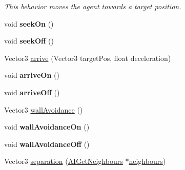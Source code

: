 \begin{DoxyCompactItemize}
\begin{DoxyCompactList}\small\item\em \-This behavior moves the agent towards a target position. \end{DoxyCompactList}\item 
\hypertarget{classAIMovementController_a011043dd19b70d4e670a4b7ab1831b69}{
void {\bfseries seek\-On} ()}
\label{d2/d30/classAIMovementController_a011043dd19b70d4e670a4b7ab1831b69}

\item 
\hypertarget{classAIMovementController_a5499e71d0aeba1f17d7c24cf03bbff23}{
void {\bfseries seek\-Off} ()}
\label{d2/d30/classAIMovementController_a5499e71d0aeba1f17d7c24cf03bbff23}

\item 
\-Vector3 \hyperlink{classAIMovementController_a00acc2f75e47d354f94d27c05a82dda1}{arrive} (\-Vector3 target\-Pos, float deceleration)
\item 
\hypertarget{classAIMovementController_a648dafc01d2fde5d0002193bf1f6a38a}{
void {\bfseries arrive\-On} ()}
\label{d2/d30/classAIMovementController_a648dafc01d2fde5d0002193bf1f6a38a}

\item 
\hypertarget{classAIMovementController_a8a94c78c6b69ece231be6751f5bfdd63}{
void {\bfseries arrive\-Off} ()}
\label{d2/d30/classAIMovementController_a8a94c78c6b69ece231be6751f5bfdd63}

\item 
\-Vector3 \hyperlink{classAIMovementController_a10a45f42bd43e6911d8204d68b58e5f4}{wall\-Avoidance} ()
\item 
\hypertarget{classAIMovementController_a470f2c25e0fcacf73a419dbd33eeca84}{
void {\bfseries wall\-Avoidance\-On} ()}
\label{d2/d30/classAIMovementController_a470f2c25e0fcacf73a419dbd33eeca84}

\item 
\hypertarget{classAIMovementController_a89c3a00ef13d96c99d5720c3c5259b4e}{
void {\bfseries wall\-Avoidance\-Off} ()}
\label{d2/d30/classAIMovementController_a89c3a00ef13d96c99d5720c3c5259b4e}

\item 
\hypertarget{classAIMovementController_afc0a67cbcef5fd7b15352769b52ff6b9}{
\-Vector3 \hyperlink{classAIMovementController_afc0a67cbcef5fd7b15352769b52ff6b9}{separation} (\hyperlink{classAIGetNeighbours}{\-A\-I\-Get\-Neighbours} $\ast$\hyperlink{classAIMovementController_addc735dc467b412a98c0d15fd4581b7c}{neighbours})}
\label{d2/d30/classAIMovementController_afc0a67cbcef5fd7b15352769b52ff6b9}


\end{DoxyCompactItemize}

